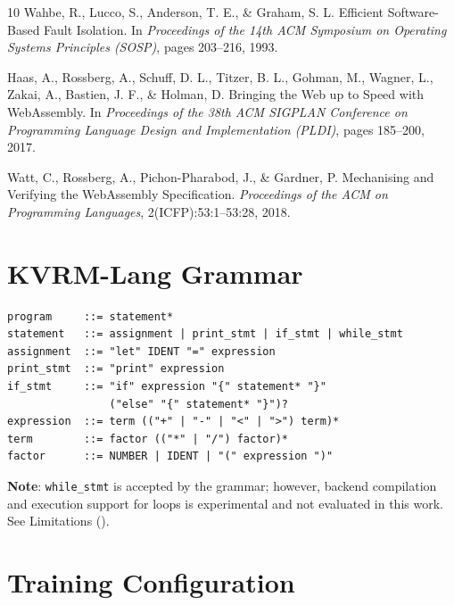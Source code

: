 \documentclass[11pt,a4paper]{article}
\begin{document}
\begin{thebibliography}{10}
Wahbe, R., Lucco, S., Anderson, T. E., \& Graham, S. L.
\newblock Efficient Software-Based Fault Isolation.
\newblock In \textit{Proceedings of the 14th ACM Symposium on Operating Systems Principles (SOSP)}, pages 203--216, 1993.

Haas, A., Rossberg, A., Schuff, D. L., Titzer, B. L., Gohman, M., Wagner, L., Zakai, A., Bastien, J. F., \& Holman, D.
\newblock Bringing the Web up to Speed with WebAssembly.
\newblock In \textit{Proceedings of the 38th ACM SIGPLAN Conference on Programming Language Design and Implementation (PLDI)}, pages 185--200, 2017.

Watt, C., Rossberg, A., Pichon-Pharabod, J., \& Gardner, P.
\newblock Mechanising and Verifying the WebAssembly Specification.
\newblock \textit{Proceedings of the ACM on Programming Languages}, 2(ICFP):53:1--53:28, 2018.

\end{thebibliography}

\appendix

\section{KVRM-Lang Grammar}
\label{app:grammar}

\begin{lstlisting}[caption=KVRM-Lang BNF Grammar]
program     ::= statement*
statement   ::= assignment | print_stmt | if_stmt | while_stmt
assignment  ::= "let" IDENT "=" expression
print_stmt  ::= "print" expression
if_stmt     ::= "if" expression "{" statement* "}"
                ("else" "{" statement* "}")?
expression  ::= term (("+" | "-" | "<" | ">") term)*
term        ::= factor (("*" | "/") factor)*
factor      ::= NUMBER | IDENT | "(" expression ")"
\end{lstlisting}

\textbf{Note}: \texttt{while\_stmt} is accepted by the grammar; however, backend compilation and execution support for loops is experimental and not evaluated in this work. See Limitations ().

\section{Training Configuration}
\label{app:training}
\end{document}
